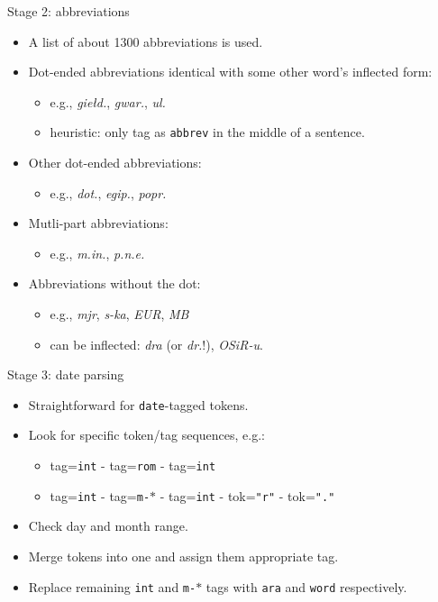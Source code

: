 \documentclass[12pt]{beamer}
\begin{document}
\begin{frame}{Stage 2: abbreviations}
    \begin{itemize}
        \item A list of about 1300 abbreviations is used.
        \item Dot-ended abbreviations identical with some other word's inflected form:
            \begin{itemize}
                \item e.g., \textit{giełd.}, \textit{gwar.}, \textit{ul.}
                \item heuristic: only tag as \texttt{abbrev} in the middle of a sentence.
            \end{itemize}
        \item Other dot-ended abbreviations:
            \begin{itemize}
                \item e.g., \textit{dot.}, \textit{egip.}, \textit{popr.}
            \end{itemize}
        \item Mutli-part abbreviations:
            \begin{itemize}
                \item e.g., \textit{m.in.}, \textit{p.n.e.}
            \end{itemize}
        \item Abbreviations without the dot:
            \begin{itemize}
                \item e.g., \textit{mjr}, \textit{s-ka}, \textit{EUR}, \textit{MB}
                \item can be inflected: \textit{dra} (or \textit{dr.}!), \textit{OSiR-u}.
            \end{itemize}
    \end{itemize}
\end{frame}
\begin{frame}{Stage 3: date parsing}
    \begin{itemize}
        \item Straightforward for \texttt{date}-tagged tokens.
        \item Look for specific token/tag sequences, e.g.:
            \begin{itemize}
                \item tag=\texttt{int} - tag=\texttt{rom} - tag=\texttt{int}
                \item tag=\texttt{int} - tag=\texttt{m-$\ast$} - tag=\texttt{int} - tok=\texttt{"r"} - tok=\texttt{"."}
            \end{itemize}
        \item Check day and month range.
        \item Merge tokens into one and assign them appropriate tag.
        \item Replace remaining \texttt{int} and \texttt{m-$\ast$} tags with \texttt{ara} and \texttt{word} respectively.
    \end{itemize}
\end{frame}
\end{document}
